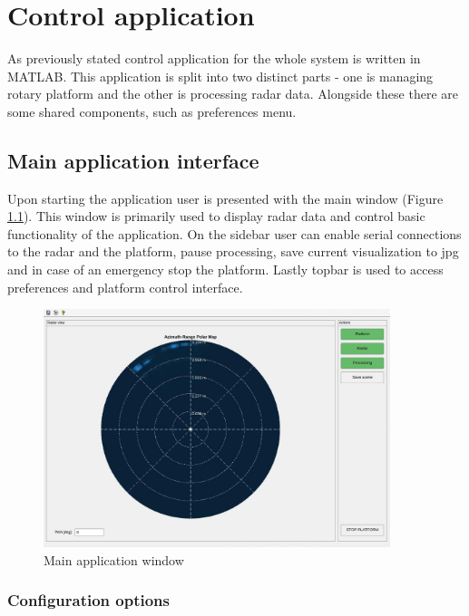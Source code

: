 \chapter{Control application}

As previously stated control application for the whole system is written in MATLAB.
This application is split into two distinct parts - one is managing rotary platform and the other is processing radar data.
Alongside these there are some shared components, such as preferences menu.

\section{Main application interface}

Upon starting the application user is presented with the main window (Figure \ref{fig:main_window}).
This window is primarily used to display radar data and control basic functionality of the application.
On the sidebar user can enable serial connections to the radar and the platform, pause processing, save current visualization to jpg and in case of an emergency stop the platform.
Lastly topbar is used to access preferences and platform control interface.

\begin{figure}[h!]
  \centering
  \includegraphics[width=0.9\textwidth]{../img/vis_range_azimuth.jpg}
  \caption[Main application window]{Main application window}
  \label{fig:main_window}
\end{figure}

\subsection{Configuration options}

